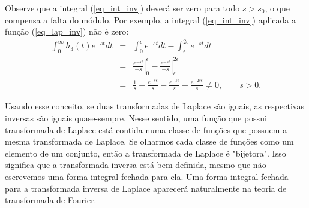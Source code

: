 Observe que a integral (\ref{eq_int_inv}) deverá ser zero para todo $s>s_0$, o que compensa a falta do módulo. Por exemplo, a integral (\ref{eq_int_inv}) aplicada a função (\ref{eq_lap_inv}) não é zero:
\begin{eqnarray*}
\int_0^\infty h_3(t)e^{-st}dt&=&\int_0^\epsilon e^{-st}dt-\int_\epsilon^{2\epsilon} e^{-st}dt\\
&=&\left.\frac{ e^{-st}}{-s}\right|_0^\epsilon-\left.\frac{e^{-st}}{-s}\right|_{\epsilon}^{2\epsilon}\\
&=&\frac{1}{s}-\frac{ e^{-s\epsilon}}{s}-\frac{e^{-s\epsilon}}{s}+\frac{e^{-2s\epsilon}}{s}\neq 0,\qquad s>0.
\end{eqnarray*}


Usando esse conceito, se duas transformadas de Laplace são iguais, as respectivas inversas são iguais quase-sempre. Nesse sentido, uma função que possui transformada de Laplace está contida numa classe de funções que possuem a mesma transformada de Laplace. Se olharmos cada classe de funções como um elemento de um conjunto, então a transformada de Laplace é "bijetora". Isso significa que a transformada inversa está bem definida, mesmo que não escrevemos uma forma integral fechada para ela. Uma forma integral fechada para a transformada inversa de Laplace aparecerá naturalmente na teoria de transformada de Fourier.

